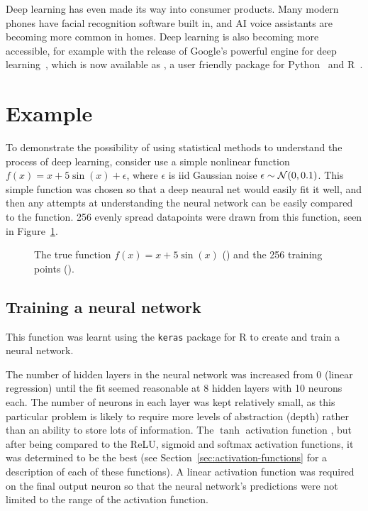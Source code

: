 Deep learning has even made its way into consumer products.
Many modern phones have facial recognition software built in, and \ac{AI} voice assistants are becoming more common in homes.
Deep learning is also becoming more accessible, for example with the release of Google's powerful  engine for deep learning~\autocite{abadi2016}, which is now available as , a user friendly package for Python~\autocite{chollet2015} and R~\autocite{allaire2018}.

\section{Example}

To demonstrate the possibility of using statistical methods to understand the process of deep learning, consider use a simple nonlinear function \(f(x) = x + 5 \sin(x) + \epsilon\), where \(\epsilon\) is iid Gaussian noise \(\epsilon \sim \mathcal{N}(0, 0.1)\).
This simple function was chosen so that a deep neaural net would easily fit it well, and then any attempts at understanding the neural network can be easily compared to the  function. 
256 evenly spread datapoints were drawn from this function, seen in Figure~\ref{fig:sin-x-dataset}.

\begin{figure}[htbp]
	\centering
	
	\caption{The true function \(f(x) = x + 5 \sin(x)\) (\truthcolour) and the 256 training points (\traincolour).}
	\label{fig:sin-x-dataset}
\end{figure}

\subsection{Training a neural network}

This function was learnt using the \texttt{keras} package for R to create and train a neural network.

The number of hidden layers in the neural network was increased from 0 (linear regression) until the fit seemed reasonable at 8 hidden layers with 10 neurons each.
The number of neurons in each layer was kept relatively small, as this particular problem is likely to require more levels of abstraction (depth) rather than an ability to store lots of information.
The \(\tanh\) activation function , but after being compared to the \ac{ReLU}, sigmoid and softmax activation functions, it was determined to be the best (see Section~\ref{sec:activation-functions} for a description of each of these functions).
A linear activation function was required on the final output neuron so that the neural network's predictions were not limited to the range of the activation function.

